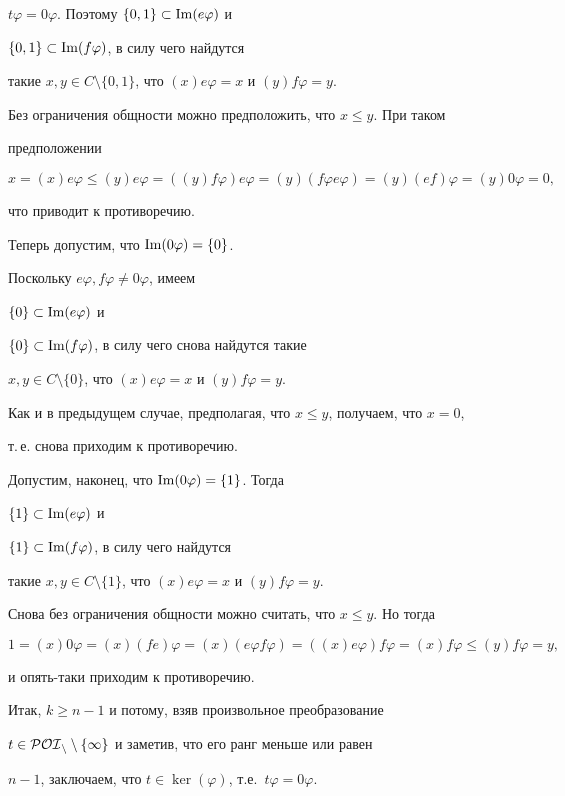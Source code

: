 \begin{pf}
$t\varphi=0\varphi$. Поэтому $\{0,1\}\subset\operatorname{Im}(e\varphi)$ и


$\{0,1\}\subset\operatorname{Im}(f\varphi)$, в силу чего найдутся


такие $x,y\in C\setminus\{0,1\}$, что $(x)e\varphi=x$ и $(y)f\varphi=y$.


Без ограничения общности можно предположить, что $x\le y$. При таком


предположении


$$


x=(x)e\varphi\le (y)e\varphi=((y)f\varphi)e\varphi=(y)(f\varphi e\varphi)=


(y)(ef)\varphi=(y)0\varphi=0,


$$


что приводит к противоречию.





Теперь допустим, что $\operatorname{Im}(0\varphi)=\{0\}$.


Поскольку $e\varphi,f\varphi\neq0\varphi$, имеем


$\{0\}\subset\operatorname{Im}(e\varphi)$ и


$\{0\}\subset\operatorname{Im}(f\varphi)$, в силу чего снова найдутся такие


$x,y\in C\setminus\{0\}$, что $(x)e\varphi=x$ и $(y)f\varphi=y$.


Как и в предыдущем случае, предполагая, что $x\le y$, получаем, что $x=0$,


т.\,е. снова приходим к противоречию.





Допустим, наконец, что $\operatorname{Im}(0\varphi)=\{1\}$. Тогда


$\{1\}\subset\operatorname{Im}(e\varphi)$ и


$\{1\}\subset\operatorname{Im}(f\varphi)$, в силу чего найдутся


такие $x,y\in C\setminus\{1\}$, что $(x)e\varphi=x$ и $(y)f\varphi=y$.


Снова без ограничения общности можно считать, что $x\le y$. Но тогда


$$


1=(x)0\varphi=(x)(fe)\varphi=(x)(e\varphi f\varphi)=((x)e\varphi)f\varphi=


(x)f\varphi\le (y)f\varphi=y,


$$


и опять-таки приходим к противоречию.





Итак, $k\ge n-1$ и потому, взяв произвольное преобразование


$t\in\cal{POI}_n\setminus\{1\}$ и заметив, что его ранг меньше или равен


$n-1$, заключаем, что $t\in\ker(\varphi)$, т.е.\ $t\varphi=0\varphi$.


\end{pf}





